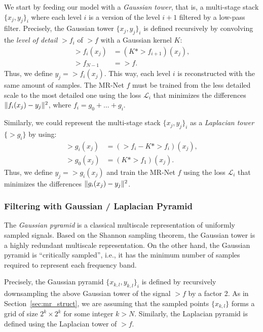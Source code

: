 We start by feeding our model with a \textit{Gaussian tower}, that is, a multi-stage stack $\{x_j, y_j\}_i$ where each level $i$ is a version of the level $i+1$ filtered by a low-pass filter. 
Precisely, the Gaussian tower $\{x_j, y_j\}_i$ is defined recursively by convolving the \textit{level of detail} $\gt{f}_i$ of $\gt{f}$ with a Gaussian kernel $K$:
\begin{align*}
    \gt{f}_i(x_j)&=\left(K*\gt{f}_{i+1}\right)(x_j),\\
    \gt{f}_{N-1}&=\gt{f}.
\end{align*}
Thus, we define $y_j=\gt{f}_i(x_j)$.
This way, each level $i$ is reconstructed with the same amount of samples. The MR-Net $f$ must be trained from the less detailed scale to the most detailed one using the loss $\mathcal{L}_i$ that minimizes the differences $\lVert f_i(x_j)-y_j\rVert^2$, where $f_i=g_0+\dots+g_{i}$.

Similarly, we could represent the multi-stage stack $\{x_j, y_j\}_i$ as a \textit{Laplacian tower} $\{\gt{g}_i\}$ by using:
\begin{align*}
    \gt{g}_i(x_j)&=\left(\gt{f}_{i}-K*\gt{f}_{i}\right)(x_j),\\
    \gt{g}_0(x_j)&=\left(K*\gt{f}_{1}\right)(x_j).
\end{align*}
Thus, we define $y_j=\gt{g}_i(x_j)$ and train the MR-Net $f$ using the loss $\mathcal{L}_i$ that minimizes the differences $\lVert g_i(x_j)-y_j\rVert^2$.


\subsubsection{Filtering with Gaussian / Laplacian Pyramid}
The \textit{Gaussian pyramid} is a classical multiscale representation of uniformly sampled signals. Based on the Shannon sampling theorem, the Gaussian tower is a highly redundant multiscale representation. On the other hand, the Gaussian pyramid is ``critically sampled'', i.e., it has the minimum number of samples required to represent each frequency band. 

Precisely, the Gaussian pyramid $\{x_{k,l}, y_{k,l}\}_i$ is defined by recursively downsampling the above Gaussian tower of the signal $\gt{f}$ by a factor 2.
As in Section~\ref{sec:mr_struct}, we are assuming that the sampled points $\{x_{k,l}\}$ forms a grid of size $2^k\times 2^k$ for some integer $k>N$.
Similarly, the Laplacian pyramid is defined using the Laplacian tower of $\gt{f}$. 

